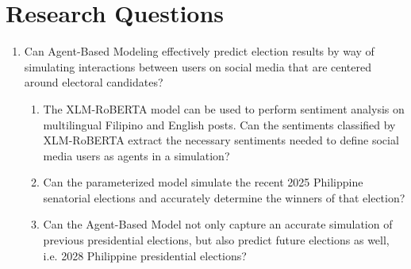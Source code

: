 \section{Research Questions}

\begin{enumerate}
    \item Can Agent-Based Modeling effectively predict election results by way of simulating interactions between users on social media that are centered around electoral candidates? 
    \begin{enumerate}
        \item The XLM-RoBERTA model can be used to perform sentiment analysis on multilingual Filipino and English posts. Can the sentiments classified by XLM-RoBERTA extract the necessary sentiments needed to define social media users as agents in a simulation?
        \item Can the parameterized model simulate the recent 2025 Philippine senatorial elections and accurately determine the winners of that election?
        \item Can the Agent-Based Model not only capture an accurate simulation of previous presidential elections, but also predict future elections as well, i.e. 2028 Philippine presidential elections?
    \end{enumerate}
\end{enumerate}